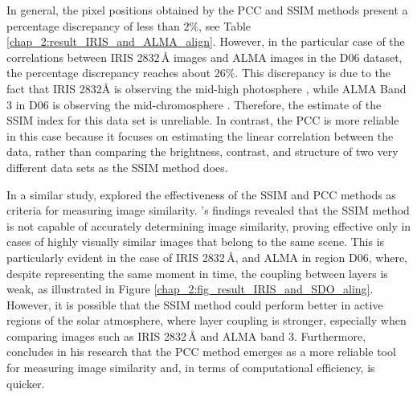 \documentclass[a4paper,alpha-refs]{eSpectra}
\begin{document}


In general, the pixel positions obtained by the PCC and SSIM methods present a percentage discrepancy of less than $2\%$, see Table \ref{chap_2:result_IRIS_and_ALMA_align}.
However, in the particular case of the correlations between IRIS 2832\,Å images and ALMA images in the D06 dataset, the percentage discrepancy reaches about $26\%$. This discrepancy is due to the fact that IRIS 2832Å is observing the mid-high photosphere \cite{grubecka_height_2016}, while ALMA Band 3 in D06 is observing the mid-chromosphere \cite{wedemeyer_sun_2020_ALMA_band_3}. Therefore, the estimate of the SSIM index for this data set is unreliable. In contrast, the PCC is more reliable in this case because it focuses on estimating the linear correlation between the data, rather than comparing the brightness, contrast, and structure of two very different data sets as the SSIM method does.


In a similar study, \cite{sim_vs_pcc_2020} explored the effectiveness of the SSIM and PCC methods as criteria for measuring image similarity. \cite{sim_vs_pcc_2020}'s findings revealed that the SSIM method is not capable of accurately determining image similarity, proving effective only in cases of highly visually similar images that belong to the same scene. This is particularly evident in the case of IRIS 2832\,Å, and ALMA in region D06, where, despite representing the same moment in time, the coupling between layers is weak, as illustrated in Figure \ref{chap_2:fig_result_IRIS_and_SDO_aling}. 
However, it is possible that the SSIM method could perform better in active regions of the solar atmosphere, where layer coupling is stronger, especially when comparing images such as IRIS 2832\,Å and ALMA band 3.
Furthermore, \cite{sim_vs_pcc_2020} concludes in his research that the PCC method emerges as a more reliable tool for measuring image similarity and, in terms of computational efficiency, is quicker.


\end{document}
